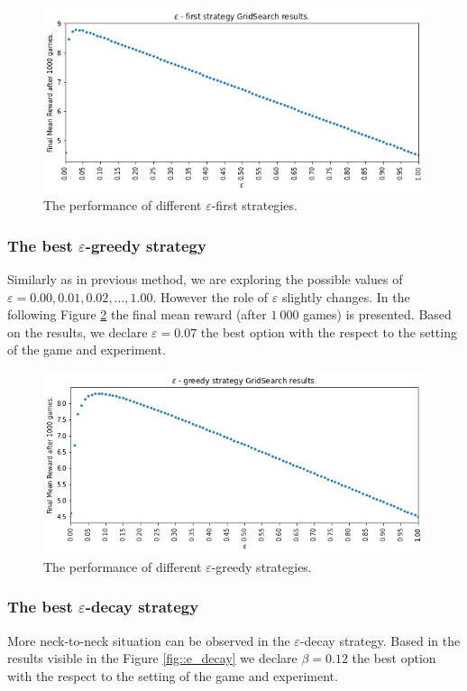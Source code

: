 \documentclass[11pt,american,czech]{article}
\begin{document}
\begin{figure}[h]
	\centering
	\includegraphics[scale=0.55]{e_fisrt.png}
	\caption{The performance of different $\varepsilon$-first strategies.}\label{fig::e_first}
\end{figure}

\subsubsection*{The best $\varepsilon$-greedy strategy}
Similarly as in previous method, we are exploring the possible values of $\varepsilon=0.00, 0.01, 0.02,\dots, 1.00.$ However the role of $\varepsilon$ slightly changes. In the following Figure \ref{fig::e_greedy} the final mean reward (after $1~000$ games) is presented. Based on the results, we declare $\varepsilon = 0.07$ the best option with the respect to the setting of the game and experiment.

\begin{figure}[h]
	\centering
	\includegraphics[scale=0.55]{e_greedy.png}
	\caption{The performance of different $\varepsilon$-greedy strategies.}\label{fig::e_greedy}
\end{figure}

\subsubsection*{The best $\varepsilon$-decay strategy}
More neck-to-neck situation can be observed in the $\varepsilon$-decay strategy. Based in the results visible in the Figure \ref{fig::e_decay} we declare $\beta = 0.12$ the best option with the respect to the setting of the game and experiment.
\end{document}

